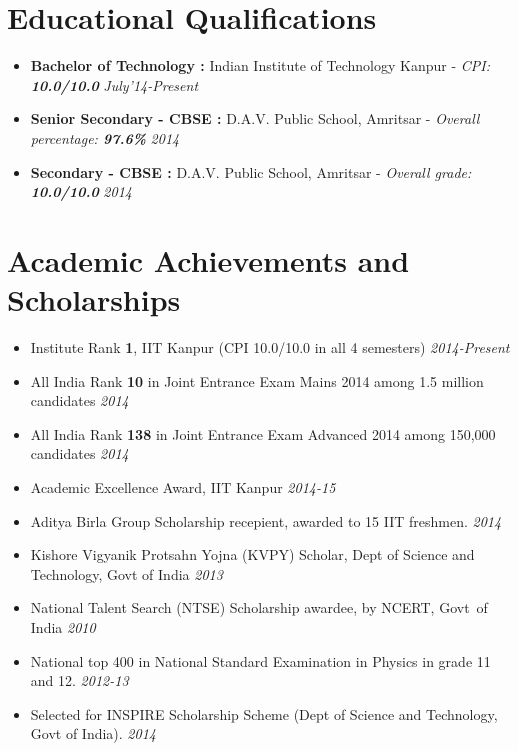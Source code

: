 \documentclass[11pt,a4paper]{moderncv}
\newcommand{\education}[5]{
\item[] \textbf{\large{#1 :}} #2 - \emph{#3: \textbf{#4}} \hfill\textit{#5}
}
\begin{document}
\maketitle
\vspace{-1cm}
\section*{Educational Qualifications}
\begin{itemize}
  \setlength\itemsep{0.2cm}
  \education{Bachelor of Technology}{Indian Institute of Technology Kanpur}{CPI}{10.0/10.0}{July'14-Present}
  \education{Senior Secondary - CBSE}{D.A.V. Public School, Amritsar}{Overall percentage}{97.6\%}{2014}
  \education{Secondary - CBSE}{D.A.V. Public School, Amritsar}{Overall grade}{10.0/10.0}{2014}
\end{itemize}

\vspace{-0.1cm}
\section*{Academic Achievements and Scholarships}
\begin{itemize}
  \setlength\itemsep{0.5em}
\item Institute Rank \textbf{1}, IIT Kanpur (CPI 10.0/10.0 in all 4
  semesters) \hfill \textit{2014-Present}
\item All India Rank \textbf{10} in Joint Entrance Exam Mains 2014 among 1.5 million candidates              \hfill \textit{2014}
\item All India Rank \textbf{138} in Joint Entrance Exam Advanced
  2014 among 150,000 candidates             \hfill \textit{2014}
\item Academic Excellence Award, IIT Kanpur \hfill \textit{2014-15}
\item Aditya Birla Group Scholarship recepient, awarded to 15 IIT freshmen.                        \hfill \textit{2014}
\item Kishore Vigyanik Protsahn Yojna (KVPY) Scholar, Dept of Science and Technology, Govt of India
  \hfill \textit{2013}
\item National Talent Search (NTSE) Scholarship awardee, by NCERT, Govt\ of India
  \hfill \textit{2010}
\item National top 400 in National Standard Examination in Physics in grade 11 and 12. \hfill \textit{2012-13}
\item Selected for INSPIRE Scholarship Scheme (Dept of Science and Technology, Govt of India).
  \hfill \textit{2014}

\end{itemize}
\end{document}

